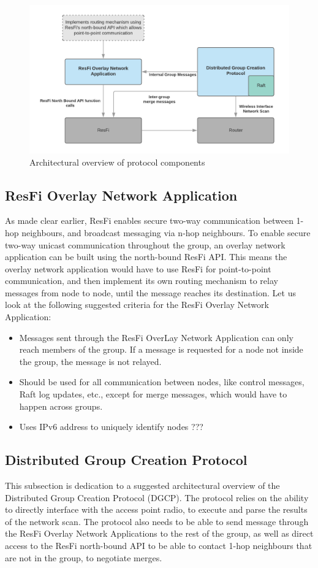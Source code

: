 \begin{figure}
	\includegraphics[width=\textwidth]{Images/dgcpoverview.png}
		\caption{Architectural overview of protocol components }%
		\label{fig:dgcpoverview}%
\end{figure}


\subsection{ResFi Overlay Network Application}
As made clear earlier, ResFi enables secure two-way communication between 1-hop neighbours, and broadcast messaging via n-hop neighbours. 
To enable secure two-way unicast communication throughout the group, an overlay network application can be built using the north-bound ResFi API. 
This means the overlay network application would have to use ResFi for point-to-point communication, and then implement its own routing mechanism
to relay messages from node to node, until the message reaches its destination. Let us look at the following suggested criteria for the ResFi Overlay Network Application:

\begin{itemize}
	\item Messages sent through the ResFi OverLay Network Application can only reach members of the group. If a message is requested for a node not inside the group,
		the message is not relayed.
  \item Should be used for all communication between nodes, like control messages, Raft log updates, etc., except for merge messages, which would have to happen across
		groups. 
	\item Uses IPv6 address to uniquely identify nodes  ???
\end{itemize}


\subsection{Distributed Group Creation Protocol}
This subsection is dedication to a suggested architectural overview of the Distributed Group Creation Protocol (DGCP). 
The protocol relies on the ability to directly interface with the access point radio, to execute and parse the results of the network scan. The protocol also
needs to be able to send message through the ResFi Overlay Network Applications to the rest of the group, as well as direct access to the ResFi north-bound API to be able to contact 1-hop
neighbours that are not in the group, to negotiate merges. 


